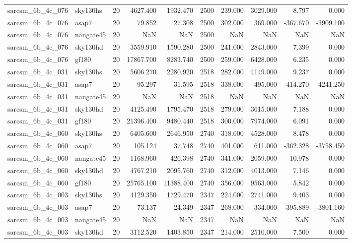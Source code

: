 \begin{tabular}{llrrrrrrrr}
sarcsm\_6b\_4c\_076 & sky130hs & 20 & 4627.400 & 1932.470 & 2500 & 239.000 & 3029.000 & 8.797 & 0.000 \\
sarcsm\_6b\_4c\_076 & asap7 & 20 & 79.852 & 27.308 & 2500 & 302.000 & 369.000 & -367.670 & -3909.100 \\
sarcsm\_6b\_4c\_076 & nangate45 & 20 & NaN & NaN & 2500 & NaN & NaN & NaN & NaN \\
sarcsm\_6b\_4c\_076 & sky130hd & 20 & 3559.910 & 1590.280 & 2500 & 241.000 & 2843.000 & 7.399 & 0.000 \\
sarcsm\_6b\_4c\_076 & gf180 & 20 & 17867.700 & 8283.740 & 2500 & 259.000 & 6428.000 & 6.235 & 0.000 \\
sarcsm\_6b\_4c\_031 & sky130hs & 20 & 5606.270 & 2280.920 & 2518 & 282.000 & 4149.000 & 9.237 & 0.000 \\
sarcsm\_6b\_4c\_031 & asap7 & 20 & 95.297 & 31.595 & 2518 & 338.000 & 495.000 & -414.270 & -4241.250 \\
sarcsm\_6b\_4c\_031 & nangate45 & 20 & NaN & NaN & 2518 & NaN & NaN & NaN & NaN \\
sarcsm\_6b\_4c\_031 & sky130hd & 20 & 4125.490 & 1795.470 & 2518 & 279.000 & 3615.000 & 7.188 & 0.000 \\
sarcsm\_6b\_4c\_031 & gf180 & 20 & 21396.400 & 9480.440 & 2518 & 300.000 & 7974.000 & 6.091 & 0.000 \\
sarcsm\_6b\_4c\_060 & sky130hs & 20 & 6405.600 & 2646.950 & 2740 & 318.000 & 4528.000 & 8.478 & 0.000 \\
sarcsm\_6b\_4c\_060 & asap7 & 20 & 105.124 & 37.748 & 2740 & 401.000 & 611.000 & -362.328 & -3758.450 \\
sarcsm\_6b\_4c\_060 & nangate45 & 20 & 1168.960 & 426.398 & 2740 & 341.000 & 2059.000 & 10.978 & 0.000 \\
sarcsm\_6b\_4c\_060 & sky130hd & 20 & 4767.210 & 2095.760 & 2740 & 312.000 & 4013.000 & 7.146 & 0.000 \\
sarcsm\_6b\_4c\_060 & gf180 & 20 & 25765.100 & 11388.400 & 2740 & 356.000 & 9563.000 & 5.842 & 0.000 \\
sarcsm\_6b\_4c\_003 & sky130hs & 20 & 4129.350 & 1729.470 & 2347 & 224.000 & 2741.000 & 9.403 & 0.000 \\
sarcsm\_6b\_4c\_003 & asap7 & 20 & 73.137 & 24.349 & 2347 & 268.000 & 334.000 & -395.889 & -3801.160 \\
sarcsm\_6b\_4c\_003 & nangate45 & 20 & NaN & NaN & 2347 & NaN & NaN & NaN & NaN \\
sarcsm\_6b\_4c\_003 & sky130hd & 20 & 3112.520 & 1403.850 & 2347 & 214.000 & 2510.000 & 7.500 & 0.000 \\

\end{tabular}
